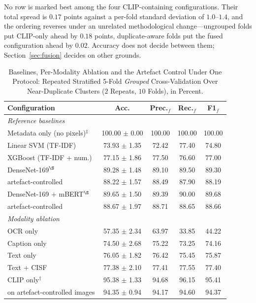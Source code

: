 \documentclass[journal]{IEEEtran}
\begin{document}
No row is marked best among the four CLIP-containing configurations. Their
total spread is $0.17$ points against a per-fold standard deviation of
$1.0$--$1.4$, and the ordering reverses under an unrelated methodological
change---ungrouped folds put CLIP-only ahead by $0.18$ points, duplicate-aware
folds put the fused configuration ahead by $0.02$. Accuracy does not decide
between them; Section~\ref{sec:fusion} decides on other grounds.

\begin{table}[!tb]
\caption{Baselines, Per-Modality Ablation and the Artefact Control Under One
Protocol: Repeated Stratified 5-Fold \emph{Grouped} Cross-Validation Over
Near-Duplicate Clusters ($2$ Repeats, $10$ Folds), in Percent.}
\label{tab:ablation}
\centering
\setlength{\tabcolsep}{3.5pt}
\footnotesize
\begin{tabular}{lcccc}
\toprule
\textbf{Configuration} & \textbf{Acc.} & \textbf{Prec.$_{f}$} &
\textbf{Rec.$_{f}$} & \textbf{F1$_{f}$} \\
\midrule
\multicolumn{5}{l}{\emph{Reference baselines}} \\
Metadata only (no pixels)$^{\ddagger}$ & 100.00 $\pm$ 0.00 & 100.00 & 100.00 & 100.00 \\
Linear SVM (TF-IDF)     & 73.93 $\pm$ 1.35 & 72.42 & 77.40 & 74.80 \\
XGBoost (TF-IDF + num.) & 77.15 $\pm$ 1.86 & 77.50 & 76.60 & 77.00 \\
DenseNet-169$^{\S}$     & 89.28 $\pm$ 1.48 & 89.10 & 89.50 & 89.30 \\
\quad artefact-controlled & 88.22 $\pm$ 1.57 & 88.49 & 87.90 & 88.19 \\
DenseNet-169 + mBERT$^{\S}$ & 89.65 $\pm$ 1.50 & 89.39 & 90.00 & 89.68 \\
\quad artefact-controlled & 88.67 $\pm$ 1.97 & 88.71 & 88.65 & 88.66 \\
\midrule
\multicolumn{5}{l}{\emph{Modality ablation}} \\
OCR only              & 57.35 $\pm$ 2.34 & 63.97 & 33.85 & 44.22 \\
Caption only          & 74.50 $\pm$ 2.68 & 75.22 & 73.25 & 74.16 \\
Text only             & 76.05 $\pm$ 1.82 & 76.42 & 75.45 & 75.87 \\
Text + CISF           & 77.38 $\pm$ 2.10 & 77.41 & 77.55 & 77.40 \\
\midrule
CLIP only$^{\dagger}$ & 95.38 $\pm$ 1.33 & 94.68 & 96.15 & 95.41 \\
\quad on artefact-controlled images & 94.35 $\pm$ 0.94 & 94.17 & 94.60 & 94.37 \\

\end{tabular}
\end{table}
\end{document}
